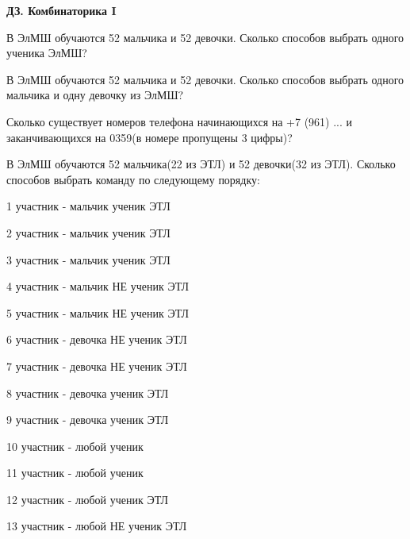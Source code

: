\centerline{\bf \Huge ДЗ. Комбинаторика I}

 В ЭлМШ обучаются 52 мальчика и 52 девочки. Сколько способов выбрать одного ученика ЭлМШ?

 В ЭлМШ обучаются 52 мальчика и 52 девочки. Сколько способов выбрать одного мальчика и одну девочку из ЭлМШ?

 Сколько существует номеров телефона начинающихся на +7 (961) ... и заканчивающихся на 0359(в номере пропущены 3 цифры)?

 В ЭлМШ обучаются 52 мальчика(22 из ЭТЛ) и 52 девочки(32 из ЭТЛ). Сколько способов выбрать команду по следующему порядку:

1 участник - мальчик ученик ЭТЛ

2 участник - мальчик ученик ЭТЛ

3 участник - мальчик ученик ЭТЛ

4 участник - мальчик НЕ ученик ЭТЛ

5 участник - мальчик НЕ ученик ЭТЛ

6 участник - девочка НЕ ученик ЭТЛ

7 участник - девочка НЕ ученик ЭТЛ

8 участник - девочка ученик ЭТЛ

9 участник - девочка ученик ЭТЛ

10 участник - любой ученик

11 участник - любой ученик

12 участник - любой ученик ЭТЛ

13 участник - любой НЕ ученик ЭТЛ
